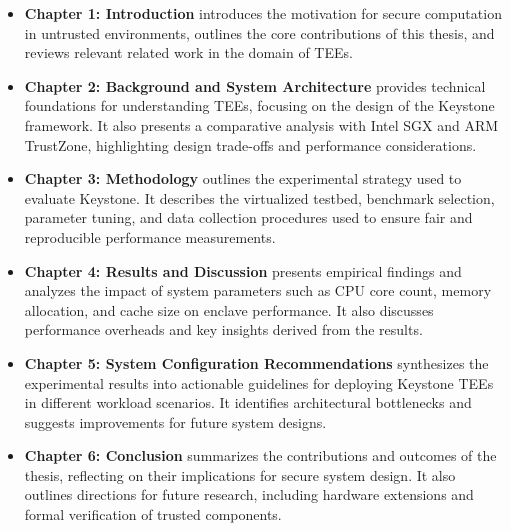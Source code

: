 \begin{itemize}
    \item \textbf{Chapter 1: Introduction} introduces the motivation for secure computation in untrusted environments, outlines the core contributions of this thesis, and reviews relevant related work in the domain of TEEs.
    
    \item \textbf{Chapter 2: Background and System Architecture} provides technical foundations for understanding TEEs, focusing on the design of the Keystone framework. It also presents a comparative analysis with Intel SGX and ARM TrustZone, highlighting design trade-offs and performance considerations.
    
    \item \textbf{Chapter 3: Methodology} outlines the experimental strategy used to evaluate Keystone. It describes the virtualized testbed, benchmark selection, parameter tuning, and data collection procedures used to ensure fair and reproducible performance measurements.
    
    \item \textbf{Chapter 4: Results and Discussion} presents empirical findings and analyzes the impact of system parameters such as CPU core count, memory allocation, and cache size on enclave performance. It also discusses performance overheads and key insights derived from the results.
    
    \item \textbf{Chapter 5: System Configuration Recommendations} synthesizes the experimental results into actionable guidelines for deploying Keystone TEEs in different workload scenarios. It identifies architectural bottlenecks and suggests improvements for future system designs.
    
    \item \textbf{Chapter 6: Conclusion} summarizes the contributions and outcomes of the thesis, reflecting on their implications for secure system design. It also outlines directions for future research, including hardware extensions and formal verification of trusted components.
\end{itemize}